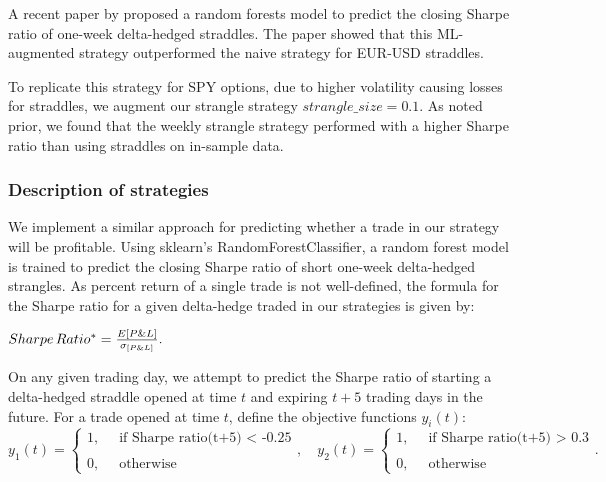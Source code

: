 \documentclass[10pt]{article}
\theoremstyle{definition}
\begin{document}
A recent paper by \citet{dierckx_trading_2022} proposed a random forests model to predict the closing Sharpe ratio of one-week delta-hedged straddles. The paper showed that this ML-augmented strategy outperformed the naive strategy for EUR-USD straddles.

To replicate this strategy for SPY options, due to higher volatility causing losses for straddles, we augment our strangle strategy $\textit{strangle\_size}= 0.1$. As noted prior, we found that the weekly strangle strategy performed with a higher Sharpe ratio than using straddles on in-sample data.

\subsubsection*{Description of strategies}

We implement a similar approach for predicting whether a trade in our strategy will be profitable. Using sklearn's RandomForestClassifier, a random forest model is trained to predict the closing Sharpe ratio of short one-week delta-hedged strangles. As percent return of a single trade is not well-defined, the formula for the Sharpe ratio for a given delta-hedge traded in our strategies is given by:

\begin{center} 
$
\begin{matrix}
Sharpe \,  Ratio^* = {E[P \& L] \over \sigma_{[P\&L]} }.
\end{matrix}
$
\end{center}

 On any given trading day, we attempt to predict the Sharpe ratio of starting a delta-hedged straddle opened at time $t$ and expiring $t+ 5$ trading days in the future. For a trade opened at time $t$, define the objective functions $y_i(t)$:
$$ y_1(t)=\left\{
\begin{aligned}
1,  & \ \text{ if Sharpe ratio(t+5) < -0.25} \\ \\
0,  &\ \text{ otherwise}
\end{aligned}
\right. , \quad  y_2(t)=\left\{
\begin{aligned}
1,  & \ \text{ if Sharpe ratio(t+5) > 0.3} \\ \\
0,  &\ \text{ otherwise}
\end{aligned}
\right. .
$$
\end{document}
